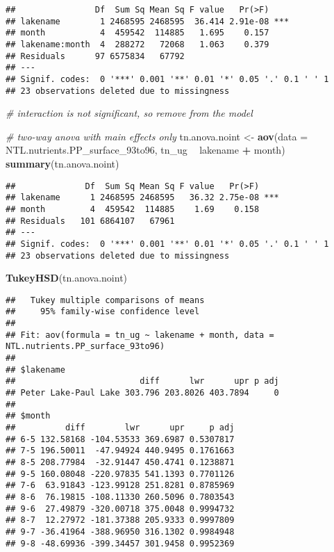 \documentclass[
]{article}
\newenvironment{Shaded}{\begin{snugshade}}{\end{snugshade}}
\newcommand{\CommentTok}[1]{\textcolor[rgb]{0.56,0.35,0.01}{\textit{#1}}}
\newcommand{\DataTypeTok}[1]{\textcolor[rgb]{0.13,0.29,0.53}{#1}}
\newcommand{\KeywordTok}[1]{\textcolor[rgb]{0.13,0.29,0.53}{\textbf{#1}}}
\newcommand{\NormalTok}[1]{#1}
\newcommand{\OperatorTok}[1]{\textcolor[rgb]{0.81,0.36,0.00}{\textbf{#1}}}
\newcommand{\StringTok}[1]{\textcolor[rgb]{0.31,0.60,0.02}{#1}}
\begin{document}
\begin{verbatim}
##                Df  Sum Sq Mean Sq F value   Pr(>F)    
## lakename        1 2468595 2468595  36.414 2.91e-08 ***
## month           4  459542  114885   1.695    0.157    
## lakename:month  4  288272   72068   1.063    0.379    
## Residuals      97 6575834   67792                     
## ---
## Signif. codes:  0 '***' 0.001 '**' 0.01 '*' 0.05 '.' 0.1 ' ' 1
## 23 observations deleted due to missingness
\end{verbatim}

\begin{Shaded}
\begin{Highlighting}[]
\CommentTok{# interaction is not significant, so remove from the model}

\CommentTok{# two-way anova with main effects only}
\NormalTok{tn.anova.noint <-}\StringTok{ }\KeywordTok{aov}\NormalTok{(}\DataTypeTok{data =}\NormalTok{ NTL.nutrients.PP_surface_93to96, tn_ug }\OperatorTok{~}\StringTok{ }\NormalTok{lakename }\OperatorTok{+}\StringTok{ }\NormalTok{month)}
\KeywordTok{summary}\NormalTok{(tn.anova.noint)}
\end{Highlighting}
\end{Shaded}

\begin{verbatim}
##              Df  Sum Sq Mean Sq F value   Pr(>F)    
## lakename      1 2468595 2468595   36.32 2.75e-08 ***
## month         4  459542  114885    1.69    0.158    
## Residuals   101 6864107   67961                     
## ---
## Signif. codes:  0 '***' 0.001 '**' 0.01 '*' 0.05 '.' 0.1 ' ' 1
## 23 observations deleted due to missingness
\end{verbatim}

\begin{Shaded}
\begin{Highlighting}[]
\KeywordTok{TukeyHSD}\NormalTok{(tn.anova.noint)}
\end{Highlighting}
\end{Shaded}

\begin{verbatim}
##   Tukey multiple comparisons of means
##     95% family-wise confidence level
## 
## Fit: aov(formula = tn_ug ~ lakename + month, data = NTL.nutrients.PP_surface_93to96)
## 
## $lakename
##                         diff      lwr      upr p adj
## Peter Lake-Paul Lake 303.796 203.8026 403.7894     0
## 
## $month
##          diff        lwr      upr     p adj
## 6-5 132.58168 -104.53533 369.6987 0.5307817
## 7-5 196.50011  -47.94924 440.9495 0.1761663
## 8-5 208.77984  -32.91447 450.4741 0.1238871
## 9-5 160.08048 -220.97835 541.1393 0.7701126
## 7-6  63.91843 -123.99128 251.8281 0.8785969
## 8-6  76.19815 -108.11330 260.5096 0.7803543
## 9-6  27.49879 -320.00718 375.0048 0.9994732
## 8-7  12.27972 -181.37388 205.9333 0.9997809
## 9-7 -36.41964 -388.96950 316.1302 0.9984948
## 9-8 -48.69936 -399.34457 301.9458 0.9952369
\end{verbatim}
\end{document}
